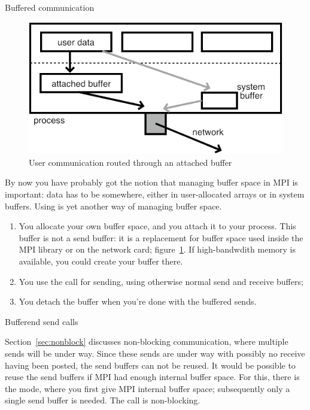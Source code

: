  {Buffered communication}
\label{sec:buffered}

\begin{figure}[ht]
  \includegraphics[scale=.5]{graphics/bufferattach}
  \caption{User communication routed through an attached buffer}
  \label{fig:bufattach}
\end{figure}

By now you have probably got the notion that managing buffer
space in MPI is important: data has to be somewhere, either in
user-allocated arrays or in system buffers. Using
 is yet another
way of managing buffer space.
\begin{enumerate}
\item You allocate your own buffer space, and you attach it to your
  process. This buffer is not a send buffer: it is a replacement for
  buffer space used inside the MPI library or on the network card;
  figure~\ref{fig:bufattach}. If high-bandwdith memory is available,
  you could create your buffer there.
\item You use the  call for sending, using
  otherwise normal send and receive buffers;
\item You detach the buffer when you're done with the buffered sends.
\end{enumerate}

 {Bufferend send calls}

Section~\ref{sec:nonblock} discusses non-blocking communication, where
multiple sends will be under way. Since these sends are under way with
possibly no receive having been posted, the send buffers can not be
reused. It would be possible to reuse the send buffers if MPI had
enough internal buffer space. For this, there is the
 mode, where you first give MPI internal buffer
space; subsequently only a single send buffer is needed. The
 call is non-blocking.

